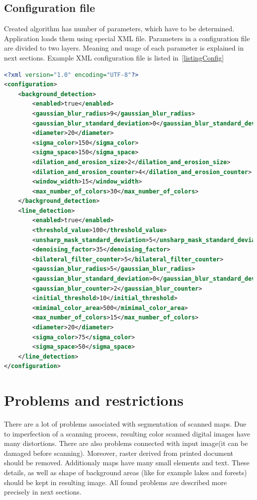 \documentclass[a4paper,onecolumn,oneside,12pt]{memoir}
\begin{document}
\subsection{Configuration file}

Created algorithm has number of parameters, which have to be determined. Application loads them
using special XML file. Parameters in a configuration file are divided to two layers. Meaning
and usage of each parameter is explained in next sections. Example XML configuration file is
listed in~\ref{listingConfig}

\begin{lstlisting}[caption=Example configuration XML file,label=listingConfig,language=xml]
<?xml version="1.0" encoding="UTF-8"?>
<configuration>
    <background_detection>
        <enabled>true</enabled>
        <gaussian_blur_radius>9</gaussian_blur_radius>
        <gaussian_blur_standard_deviation>0</gaussian_blur_standard_deviation>
        <diameter>20</diameter>
        <sigma_color>150</sigma_color>
        <sigma_space>150</sigma_space>
        <dilation_and_erosion_size>2</dilation_and_erosion_size>
        <dilation_and_erosion_counter>4</dilation_and_erosion_counter>
        <window_width>15</window_width>
        <max_number_of_colors>30</max_number_of_colors>
    </background_detection>
    <line_detection>
        <enabled>true</enabled>
        <threshold_value>100</threshold_value>
        <unsharp_mask_standard_deviation>5</unsharp_mask_standard_deviation>
        <denoising_factor>35</denoising_factor>
        <bilateral_filter_counter>5</bilateral_filter_counter>
        <gaussian_blur_radius>5</gaussian_blur_radius>
        <gaussian_blur_standard_deviation>0</gaussian_blur_standard_deviation>
        <gaussian_blur_counter>2</gaussian_blur_counter>
        <initial_threshold>10</initial_threshold>
        <mimimal_color_area>500</mimimal_color_area>
        <max_number_of_colors>15</max_number_of_colors>
        <diameter>20</diameter>
        <sigma_color>75</sigma_color>
        <sigma_space>50</sigma_space>
    </line_detection>
</configuration>
\end{lstlisting}

\section{Problems and restrictions}

There are a lot of problems associated with segmentation of scanned maps. Due to imperfection of
a scanning process, resulting color scanned digital images have many distortions.
There are also problems connected with input image(it can be damaged before scanning).
Moreover, raster derived from printed document should be removed.
Additionaly maps have many small elements and text. These details, as well as shape of background
areas (like for example lakes and forests) should be kept in resulting image.
All found problems are described more precisely in next sections.
\end{document}
